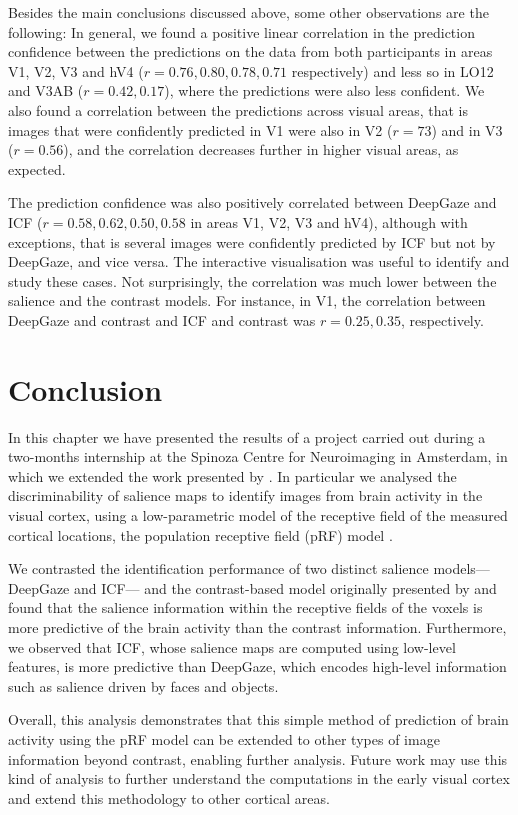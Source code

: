 {Besides the main conclusions discussed above, some other observations are the following: In general, we found a positive linear correlation in the prediction confidence between the predictions on the data from both participants in areas V1, V2, V3 and hV4 ($r = 0.76, 0.80, 0.78, 0.71$ respectively) and less so in LO12 and V3AB ($r = 0.42, 0.17$), where the predictions were also less confident. We also found a correlation between the predictions across visual areas, that is images that were confidently predicted in V1 were also in V2 ($r = 73$) and in V3 ($r = 0.56$), and the correlation decreases further in higher visual areas, as expected. 

The prediction confidence was also positively correlated between DeepGaze and ICF ($r = 0.58, 0.62, 0.50, 0.58$ in areas V1, V2, V3 and hV4), although with exceptions, that is several images were confidently predicted by ICF but not by DeepGaze, and vice versa. The interactive visualisation was useful to identify and study these cases. Not surprisingly, the correlation was much lower between the salience  and the contrast models. For instance, in V1, the correlation between DeepGaze and contrast and ICF and contrast was $r = 0.25, 0.35$, respectively.

\section{Conclusion}
\label{sec:imageid-conclusion}
In this chapter we have presented the results of a project carried out during a two-months internship at the Spinoza Centre for Neuroimaging in Amsterdam, in which we extended the work presented by \citet{zuiderbaan2017imageidentification}. In particular we analysed the discriminability of salience maps to identify images from brain activity in the visual cortex, using a low-parametric model of the receptive field of the measured cortical locations, the population receptive field (pRF) model \citep{dumoulin2008prf}.

We contrasted the identification performance of two distinct salience models---DeepGaze and ICF--- and the contrast-based model originally presented by \citet{zuiderbaan2017imageidentification} and found that the salience information within the receptive fields of the voxels is more predictive of the brain activity than the contrast information. Furthermore, we observed that ICF, whose salience maps are computed using low-level features, is more predictive than DeepGaze, which encodes high-level information such as salience driven by faces and objects.

Overall, this analysis demonstrates that this simple method of prediction of brain activity using the pRF model can be extended to other types of image information beyond contrast, enabling further analysis. Future work may use this kind of analysis to further understand the computations in the early visual cortex and extend this methodology to other cortical areas.

\chapterbibliography
}

